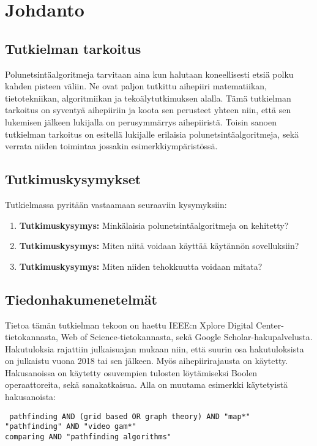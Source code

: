 \chapter{Johdanto} \label{Johdanto}

\section{Tutkielman tarkoitus}\label{tTarkoitus}
Polunetsintäalgoritmeja tarvitaan aina kun halutaan koneellisesti etsiä 
polku kahden pisteen väliin. Ne ovat paljon tutkittu aihepiiri matematiikan, 
tietotekniikan, algoritmiikan ja tekoälytutkimuksen alalla. Tämä tutkielman 
tarkoitus on syventyä aihepiiriin ja koota sen perusteet yhteen niin, että sen 
lukemisen jälkeen lukijalla on perusymmärrys aihepiiristä. Toisin sanoen 
tutkielman tarkoitus on esitellä lukijalle erilaisia polunetsintäalgoritmeja, 
sekä verrata niiden toimintaa jossakin esimerkkiympäristössä.

\section{Tutkimuskysymykset}\label{tutkimuskysymykset}
Tutkielmassa pyritään vastaamaan seuraaviin kysymyksiin:
\begin{enumerate}[label=\textbf{\arabic*.}]
	\item \label{tKysymys1} \textbf{Tutkimuskysymys:} Minkälaisia polunetsintäalgoritmeja on kehitetty?
	\item \label{tKysymys2} \textbf{Tutkimuskysymys:} Miten niitä voidaan käyttää käytännön sovelluksiin?
	\item \label{tKysymys3} \textbf{Tutkimuskysymys:} Miten niiden tehokkuutta voidaan mitata?
\end{enumerate}

\section{Tiedonhakumenetelmät}\label{tiedonhakuM}
Tietoa tämän tutkielman tekoon on haettu IEEE:n Xplore Digital 
Center-tietokannasta, Web of Science-tietokannasta, sekä Google 
Scholar-hakupalvelusta. Hakutuloksia rajattiin julkaisuajan mukaan niin, 
että suurin osa hakutuloksista on julkaistu vuona 2018 tai sen jälkeen. 
Myös aihepiirirajausta on käytetty. Hakusanoissa on käytetty osuvempien 
tulosten löytämiseksi Boolen operaattoreita, sekä sanakatkaisua. Alla on 
muutama esimerkki käytetyistä hakusanoista:
\begin{center}
\texttt{
	pathfinding AND (grid based OR graph theory) AND "map*"	\\
	"pathfinding" AND "video gam*"				\\
	comparing AND "pathfinding algorithms"			\\
}
\end{center}

